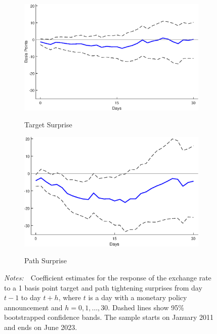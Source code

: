 \documentclass[a4paper, 12pt]{article}
\newcommand{\figtext}[1]{
	\vspace{-1ex}
	\captionsetup{justification=justified,font=footnotesize}
	\caption*{#1}
}
\newcommand{\fignotes}[1]{\figtext{\emph{Notes:~}~#1}}
\providecommand{\lastobsflwbdm}{June 2023}
\providecommand{\idxh}{h}
\begin{document}
\begin{appendices}
	\begin{figure}
		\caption{Response of the Exchange Rate to Target and Path Surprises} \label{fig:LPFX}
		\centering
		\begin{subfigure}{0.5\textwidth}
			\centering
			\includegraphics[width=\textwidth]{../Figures/Target11FX.eps} \\
			\caption{Target Surprise} \label{subfig:Target11FX}
		\end{subfigure}%
		\begin{subfigure}{0.5\textwidth}
			\centering
			\includegraphics[width=\textwidth]{../Figures/Path11FX.eps} \\
			\caption{Path Surprise} \label{subfig:Path11FX}
		\end{subfigure}
		\fignotes{Coefficient estimates for the response of the exchange rate to a 1 basis point target and path tightening surprises from day \(t - 1\) to day \(t + \idxh\), where \(t\) is a day with a monetary policy announcement and \(\idxh = 0, 1, \ldots, 30\). Dashed lines show 95\% bootstrapped confidence bands. The sample starts on January 2011 and ends on \lastobsflwbdm.}
	\end{figure}
	

\end{appendices}
\end{document}
